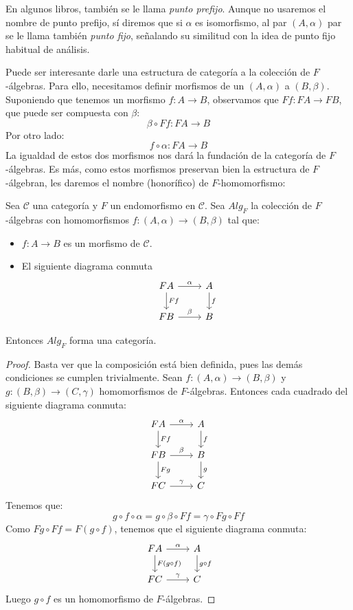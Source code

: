 \documentclass[12pt, twoside]{book}
\newcommand{\newterm}[1]{\index{#1}\emph{#1}}
\newcommand{\cat}{{\mathcal{C}}}
\begin{document}
En algunos libros, también se le llama \newterm{punto prefijo}.
Aunque no usaremos el nombre de punto prefijo, sí diremos que si $\alpha$ es isomorfismo, al par $(A,\alpha)$ par se le llama también \newterm{punto fijo}, señalando su similitud con la idea de punto fijo habitual de análisis.

Puede ser interesante darle una estructura de categoría a la colección de $F$-álgebras.
Para ello, necesitamos definir morfismos de un $(A,\alpha)$ a $(B,\beta)$.
Suponiendo que tenemos un morfismo $f \colon A \to B$, observamos que $F f \colon F A \to F B$, que puede ser compuesta con $\beta$:
\[ \beta \circ F f \colon F A \to B \]
Por otro lado:
\[ f \circ \alpha \colon F A \to B \]
La igualdad de estos dos morfismos nos dará la fundación de la categoría de $F$-álgebras.
Es más, como estos morfismos preservan bien la estructura de $F$-álgebran, les daremos el nombre (honorífico) de $F$-homomorfismo:

\begin{proposition}\label{prop:fmorfismo}
Sea $\cat$ una categoría y $F$ un endomorfismo en $\cat$.
Sea $Alg_F$ la colección de $F$-álgebras con homomorfismos $f \colon (A,\alpha) \to (B,\beta)$ tal que:
\begin{itemize}
\item $f \colon A \to B$ es un morfismo de $\cat$.
\item El siguiente diagrama conmuta
\[
\begin{tikzcd}
F A \arrow[r,"\alpha"] \arrow[d,"F f"] & A \arrow[d,"f"]\\
F B \arrow[r,"\beta"] & B
\end{tikzcd}
\]
\end{itemize}
Entonces $Alg_F$ forma una categoría.
\end{proposition}
\begin{proof}
Basta ver que la composición está bien definida, pues las demás condiciones se cumplen trivialmente.
Sean $f \colon (A,\alpha) \to (B,\beta)$ y $g \colon (B,\beta) \to (C,\gamma)$ homomorfismos de $F$-álgebras.
Entonces cada cuadrado del siguiente diagrama conmuta:
\[
\begin{tikzcd}
F A \arrow[r,"\alpha"] \arrow[d,"F f"] & A \arrow[d,"f"]\\
F B \arrow[r,"\beta"] \arrow[d,"F g"] & B \arrow[d,"g"]\\
F C \arrow[r,"\gamma"] & C
\end{tikzcd}
\]
Tenemos que:
\[ g \circ f \circ \alpha = g \circ \beta \circ F f = \gamma \circ F g \circ F f \]
Como $F g \circ F f = F (g \circ f)$, tenemos que el siguiente diagrama conmuta:
\[
\begin{tikzcd}
F A \arrow[r,"\alpha"] \arrow[d,"F (g \circ f)"] & A \arrow[d,"g \circ f"]\\
F C \arrow[r,"\gamma"] & C
\end{tikzcd}
\]
Luego $g \circ f$ es un homomorfismo de $F$-álgebras.
\end{proof}
\end{document}
